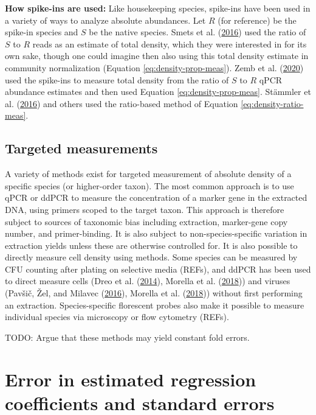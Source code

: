 \documentclass[
]{article}
\begin{document}
\textbf{How spike-ins are used:}
Like housekeeping species, spike-ins have been used in a variety of ways to analyze absolute abundances.
Let \(R\) (for reference) be the spike-in species and \(S\) be the native species.
Smets et al. (\protect\hyperlink{ref-smets2016amet}{2016}) used the ratio of \(S\) to \(R\) reads as an estimate of total density, which they were interested in for its own sake, though one could imagine then also using this total density estimate in community normalization (Equation \eqref{eq:density-prop-meas}).
Zemb et al. (\protect\hyperlink{ref-zemb2020abso}{2020}) used the spike-ins to measure total density from the ratio of \(S\) to \(R\) qPCR abundance estimates and then used Equation \eqref{eq:density-prop-meas}.
Stämmler et al. (\protect\hyperlink{ref-stammler2016adju}{2016}) and others used the ratio-based method of Equation \eqref{eq:density-ratio-meas}.

\hypertarget{targeted-measurements}{%
\subsection{Targeted measurements}\label{targeted-measurements}}

A variety of methods exist for targeted measurement of absolute density of a specific species (or higher-order taxon).
The most common approach is to use qPCR or ddPCR to measure the concentration of a marker gene in the extracted DNA, using primers scoped to the target taxon.
This approach is therefore subject to sources of taxonomic bias including extraction, marker-gene copy number, and primer-binding.
It is also subject to non-species-specific variation in extraction yields unless these are otherwise controlled for.
It is also possible to directly measure cell density using methods.
Some species can be measured by CFU counting after plating on selective media (REFs), and ddPCR has been used to direct measure cells (Dreo et al. (\protect\hyperlink{ref-dreo2014opti}{2014}), Morella et al. (\protect\hyperlink{ref-morella2018rapi}{2018})) and viruses (Pavšič, Žel, and Milavec (\protect\hyperlink{ref-pavsic2016digi}{2016}), Morella et al. (\protect\hyperlink{ref-morella2018rapi}{2018})) without first performing an extraction.
Species-specific florescent probes also make it possible to measure individual species via microscopy or flow cytometry (REFs).

TODO: Argue that these methods may yield constant fold errors.

\hypertarget{appendix-regression}{%
\section{Error in estimated regression coefficients and standard errors}\label{appendix-regression}}
\end{document}
